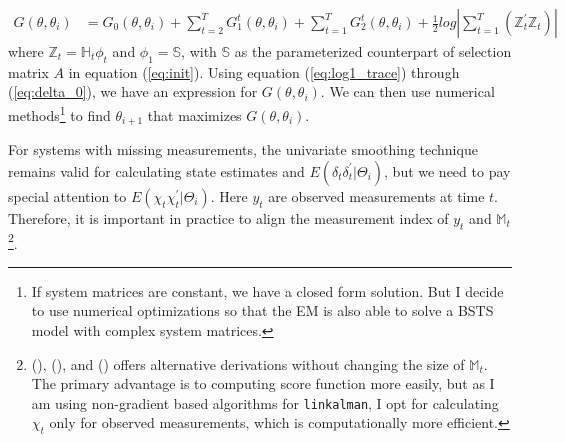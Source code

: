 \documentclass[10pt, titlepage]{article}
\numberwithin{equation}{section}
\begin{document}
\begin{align*}
    G(\theta,\theta_{i}) &= G_0(\theta,\theta_i) + \sum_{t=2}^{T}G_1^t(\theta,\theta_{i}) + \sum_{t=1}^{T}G_2^t(\theta,\theta_{i}) + \frac{1}{2}log\left|\sum_{t=1}^{T}(\mathbb{Z}_t^{'}\mathbb{Z}_t)\right| 
\end{align*}
where $\mathbb{Z}_t=\mathbb{H}_t\phi_t$ and $\phi_1=\mathbb{S}$, with $\mathbb{S}$ as the parameterized counterpart of selection matrix $A$ in equation (\ref{eq:init}). Using equation (\ref{eq:log1_trace}) through (\ref{eq:delta_0}), we have an expression for $G(\theta,\theta_i)$. We can then use numerical methods\footnote{If system matrices are constant, we have a closed form solution. But I decide to use numerical optimizations so that the EM is also able to solve a BSTS model with complex system matrices.} to find $\theta_{i+1}$ that maximizes $G(\theta,\theta_{i})$.

For systems with missing measurements, the univariate smoothing technique remains valid for calculating state estimates and $E(\delta_t\delta_t^{'}|\Theta_i)$, but we need to pay special attention to $E(\chi_t\chi_t^{'}|\Theta_i)$. Here $y_t$ are observed measurements at time $t$. Therefore, it is important in practice to align the measurement index of $y_t$ and $\mathbb{M}_t$\footnote{(\cite{shumway_stoffer_1982}), (\cite{shumway_2000}), and (\cite{shumway2017time}) offers alternative derivations without changing the size of $\mathbb{M}_t$. The primary advantage is to computing score function more easily, but as I am using non-gradient based algorithms for \texttt{linkalman}, I opt for calculating $\chi_t$ only for observed measurements, which is computationally more efficient.}.
\end{document}
